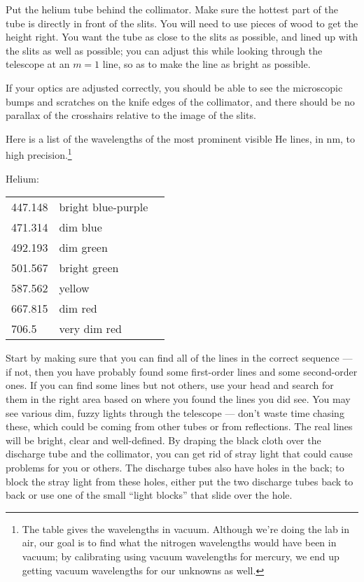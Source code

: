 Put the helium tube behind the collimator. Make sure the
hottest part of the tube is directly in
front of the slits. You will need to use pieces of wood to get the height right.
You want the tube as close to the slits as possible, and
lined up with the slits as well as possible; you can adjust
this while looking through the telescope at an $m=1$ line,
so as to make the line as bright as possible.

If your optics are adjusted correctly,
you should be able to see the microscopic
bumps and scratches on the knife edges of the collimator,
and there should be no parallax of the crosshairs relative
to the image of the slits.

Here is a list of the wavelengths of the most prominent visible He lines, in nm, to high 
precision.\footnote{The table gives the wavelengths in vacuum. Although we're doing the lab in air, our goal is to find
what the nitrogen wavelengths would have been in vacuum; by calibrating using vacuum wavelengths
for mercury, we end up getting vacuum wavelengths for our unknowns as well.}

Helium:\\
\noindent\begin{tabular}{llp{40mm}}
447.148 & bright blue-purple & \\
471.314 & dim blue & \\
492.193 & dim green & \\
501.567 & bright green & \\
587.562 & yellow & \\
667.815 & dim red & \\
706.5 & very dim red
\end{tabular}

Start by making sure
that you can find all of the lines in the correct sequence --- if
not, then you have probably found some first-order
lines and some second-order ones. If you can find some lines
but not others, use your head and search for them in the
right area based on where you found the lines you did see.
You may see various dim, fuzzy lights through the telescope
--- don't waste time chasing these, which could be coming
from other tubes or from reflections. The real lines will be
bright, clear and well-defined. By draping the black cloth over
the discharge tube and the collimator, you can get rid of stray
light that could cause problems for you or others. The discharge tubes also have
holes in the back; to block the stray
light from these holes, either put the two discharge tubes back
to back or use one of the small ``light blocks'' that slide over the hole.

